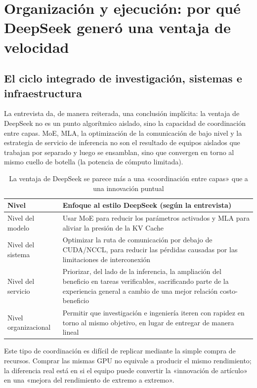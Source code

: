 \section{Organización y ejecución: por qué DeepSeek generó una ventaja de velocidad}

\subsection{El ciclo integrado de investigación, sistemas e infraestructura}

La entrevista da, de manera reiterada, una conclusión implícita: la ventaja de DeepSeek no es un punto algorítmico aislado, sino la capacidad de coordinación entre capas. MoE, MLA, la optimización de la comunicación de bajo nivel y la estrategia de servicio de inferencia no son el resultado de equipos aislados que trabajan por separado y luego se ensamblan, sino que convergen en torno al mismo cuello de botella (la potencia de cómputo limitada).

\begin{table}[H]
\centering
\begin{tabular}{lp{8.5cm}}
\toprule
\textbf{Nivel} & \textbf{Enfoque al estilo DeepSeek (según la entrevista)} \\
\midrule
Nivel del modelo & Usar MoE para reducir los parámetros activados y MLA para aliviar la presión de la KV Cache \\
Nivel del sistema & Optimizar la ruta de comunicación por debajo de CUDA/NCCL, para reducir las pérdidas causadas por las limitaciones de interconexión \\
Nivel del servicio & Priorizar, del lado de la inferencia, la ampliación del beneficio en tareas verificables, sacrificando parte de la experiencia general a cambio de una mejor relación costo-beneficio \\
Nivel organizacional & Permitir que investigación e ingeniería iteren con rapidez en torno al mismo objetivo, en lugar de entregar de manera lineal \\
\bottomrule
\end{tabular}
\caption{La ventaja de DeepSeek se parece más a una «coordinación entre capas» que a una innovación puntual}
\end{table}

Este tipo de coordinación es difícil de replicar mediante la simple compra de recursos. Comprar las mismas GPU no equivale a producir el mismo rendimiento; la diferencia real está en si el equipo puede convertir la «innovación de artículo» en una «mejora del rendimiento de extremo a extremo».

